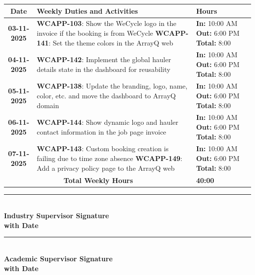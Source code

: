 \documentclass[a4paper,11pt]{article}
\begin{document}
\begin{tabularx}{\textwidth}{|c|>{\raggedright\arraybackslash}X|>{\centering\arraybackslash}m{3.5cm}|}
\hline
\rowcolor{gray!30}
\textbf{Date} & \textbf{Weekly Duties and Activities} & \textbf{Hours} \\
\hline
\textbf{03-11-2025} & \textbf{WCAPP-103}: Show the WeCycle logo in the invoice if the booking is from WeCycle \newline \textbf{WCAPP-141}: Set the theme colors in the ArrayQ web & \textbf{In:} 10:00 AM \newline \textbf{Out:} 6:00 PM \newline \textbf{Total:} 8:00 \\
\hline
\textbf{04-11-2025} & \textbf{WCAPP-142}: Implement the global hauler details state in the dashboard for reusability & \textbf{In:} 10:00 AM \newline \textbf{Out:} 6:00 PM \newline \textbf{Total:} 8:00 \\
\hline
\textbf{05-11-2025} & \textbf{WCAPP-138}: Update the branding, logo, name, color, etc. and move the dashboard to ArrayQ domain & \textbf{In:} 10:00 AM \newline \textbf{Out:} 6:00 PM \newline \textbf{Total:} 8:00 \\
\hline
\textbf{06-11-2025} & \textbf{WCAPP-144}: Show dynamic logo and hauler contact information in the job page invoice & \textbf{In:} 10:00 AM \newline \textbf{Out:} 6:00 PM \newline \textbf{Total:} 8:00 \\
\hline
\textbf{07-11-2025} & \textbf{WCAPP-143}: Custom booking creation is failing due to time zone absence \newline \textbf{WCAPP-149}: Add a privacy policy page to the ArrayQ web & \textbf{In:} 10:00 AM \newline \textbf{Out:} 6:00 PM \newline \textbf{Total:} 8:00 \\
\hline
\multicolumn{2}{|c|}{\textbf{Total Weekly Hours}} & \textbf{40:00} \\
\hline
\end{tabularx}

\vspace{3em}

\noindent
\begin{minipage}[t]{0.45\textwidth}
\rule{0.8\textwidth}{0.4pt} \\
\textbf{Industry Supervisor Signature} \\
\textbf{with Date}
\end{minipage}
\hfill
\begin{minipage}[t]{0.45\textwidth}
\rule{0.8\textwidth}{0.4pt} \\
\textbf{Academic Supervisor Signature} \\
\textbf{with Date}
\end{minipage}
\end{document}
